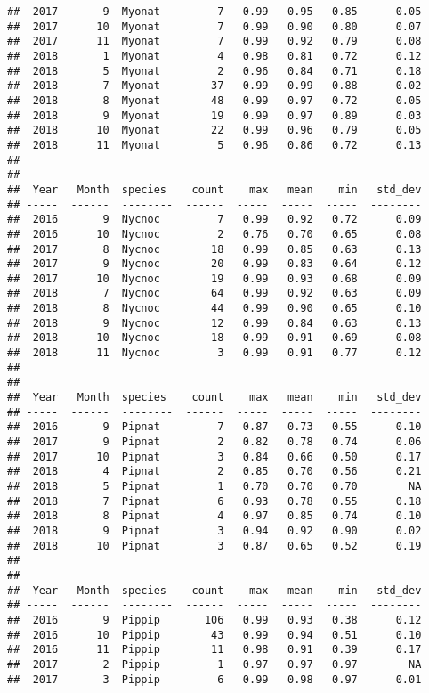 \documentclass[]{article}
\begin{document}
\begin{verbatim}
##  2017       9  Myonat         7   0.99   0.95   0.85      0.05
##  2017      10  Myonat         7   0.99   0.90   0.80      0.07
##  2017      11  Myonat         7   0.99   0.92   0.79      0.08
##  2018       1  Myonat         4   0.98   0.81   0.72      0.12
##  2018       5  Myonat         2   0.96   0.84   0.71      0.18
##  2018       7  Myonat        37   0.99   0.99   0.88      0.02
##  2018       8  Myonat        48   0.99   0.97   0.72      0.05
##  2018       9  Myonat        19   0.99   0.97   0.89      0.03
##  2018      10  Myonat        22   0.99   0.96   0.79      0.05
##  2018      11  Myonat         5   0.96   0.86   0.72      0.13
## 
## 
##  Year   Month  species    count    max   mean    min   std_dev
## -----  ------  --------  ------  -----  -----  -----  --------
##  2016       9  Nycnoc         7   0.99   0.92   0.72      0.09
##  2016      10  Nycnoc         2   0.76   0.70   0.65      0.08
##  2017       8  Nycnoc        18   0.99   0.85   0.63      0.13
##  2017       9  Nycnoc        20   0.99   0.83   0.64      0.12
##  2017      10  Nycnoc        19   0.99   0.93   0.68      0.09
##  2018       7  Nycnoc        64   0.99   0.92   0.63      0.09
##  2018       8  Nycnoc        44   0.99   0.90   0.65      0.10
##  2018       9  Nycnoc        12   0.99   0.84   0.63      0.13
##  2018      10  Nycnoc        18   0.99   0.91   0.69      0.08
##  2018      11  Nycnoc         3   0.99   0.91   0.77      0.12
## 
## 
##  Year   Month  species    count    max   mean    min   std_dev
## -----  ------  --------  ------  -----  -----  -----  --------
##  2016       9  Pipnat         7   0.87   0.73   0.55      0.10
##  2017       9  Pipnat         2   0.82   0.78   0.74      0.06
##  2017      10  Pipnat         3   0.84   0.66   0.50      0.17
##  2018       4  Pipnat         2   0.85   0.70   0.56      0.21
##  2018       5  Pipnat         1   0.70   0.70   0.70        NA
##  2018       7  Pipnat         6   0.93   0.78   0.55      0.18
##  2018       8  Pipnat         4   0.97   0.85   0.74      0.10
##  2018       9  Pipnat         3   0.94   0.92   0.90      0.02
##  2018      10  Pipnat         3   0.87   0.65   0.52      0.19
## 
## 
##  Year   Month  species    count    max   mean    min   std_dev
## -----  ------  --------  ------  -----  -----  -----  --------
##  2016       9  Pippip       106   0.99   0.93   0.38      0.12
##  2016      10  Pippip        43   0.99   0.94   0.51      0.10
##  2016      11  Pippip        11   0.98   0.91   0.39      0.17
##  2017       2  Pippip         1   0.97   0.97   0.97        NA
##  2017       3  Pippip         6   0.99   0.98   0.97      0.01

\end{verbatim}
\end{document}
